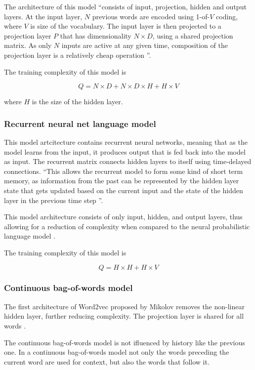 \documentclass[14pt, a4paper]{extreport}
\begin{document}
The architecture of this model ``consists of input, projection, hidden and output layers. At the input layer, \(N\) previous words are encoded using 1-of-\(V\) coding, where \(V\) is size of the vocabulary. The input layer is then projected to a projection layer \(P\) that has dimensionality \(N \times D\), using a shared projection matrix. As only \(N\) inputs are active at any given time, composition of the projection layer is a relatively cheap operation \parencite{mikolov}''.

The training complexity of this model is

\[Q = N \times D + N \times D \times H + H \times V\]

where \(H\) is the size of the hidden layer.


\subsubsection{Recurrent neural net language model}
This model artcitecture contains recurrent neural networks, meaning that as the model learns from the input, it produces output that is fed back into the model as input. The recurrent matrix connects hidden layers to itself using time-delayed connections. ``This allows the recurrent model to form some kind of short term memory, as information from the past can be represented by the hidden layer state that gets updated based on the current input and the state of the hidden layer in the previous time step \parencite{mikolov}''.

This model architecture consists of only input, hidden, and output layers, thus allowing for a reduction of complexity when compared to the neural probabilistic language model \parencite{mikolov}.

The training complexity of this model is

\[Q = H \times H + H \times V\]

\subsubsection{Continuous bag-of-words model}
The first architecture of Word2vec proposed by Mikolov removes the non-linear hidden layer, further reducing complexity. The projection layer is shared for all words \parencite{mikolov}.

The continuous bag-of-words model is not ifluenced by history like the previous one. In a continuous bag-of-words model not only the words preceding the current word are used for context, but also the words that follow it.
\end{document}
